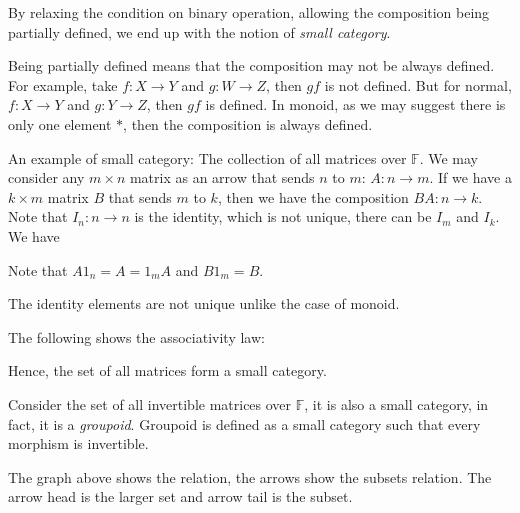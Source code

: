 \documentclass[
	11pt, %
	fleqn, %
	a4paper, %
]{LegrandOrangeBook}
\newcommand{\F}{\mathbb{F}} %
\begin{document}
By relaxing the condition on binary operation, allowing the composition being partially defined, we end up with the notion of \emph{small category}.

Being partially defined means that the composition may not be always defined. For example, take $f : X \to Y$ and $g : W \to Z$, then $gf$ is not defined. But for normal, $f : X \to Y$ and $g : Y \to Z$, then $gf$ is defined. In monoid, as we may suggest there is only one element $*$, then the composition is always defined.

An example of small category: The collection of all matrices over $\F$. We may consider any $m \times n$ matrix as an arrow that sends $n$ to $m$: $A : n \to m$. If we have a $k \times m$ matrix $B$ that sends $m$ to $k$, then we have the composition $BA : n \to k$. Note that $I_n : n \to n$ is the identity, which is not unique, there can be $I_m$ and $I_k$. We have 
\begin{center}
\end{center}
Note that $A 1_n = A = 1_m A$ and $B 1_m = B$. 

\begin{remark}
    The identity elements are not unique unlike the case of monoid.
\end{remark}

The following shows the associativity law:
\begin{center}
\end{center}

Hence, the set of all matrices form a small category.

Consider the set of all invertible matrices over $\F$, it is also a small category, in fact, it is a \emph{groupoid}. Groupoid is defined as a small category such that every morphism is invertible.

\begin{center}
\end{center}
The graph above shows the relation, the arrows show the subsets relation. The arrow head is the larger set and arrow tail is the subset.
\end{document}
